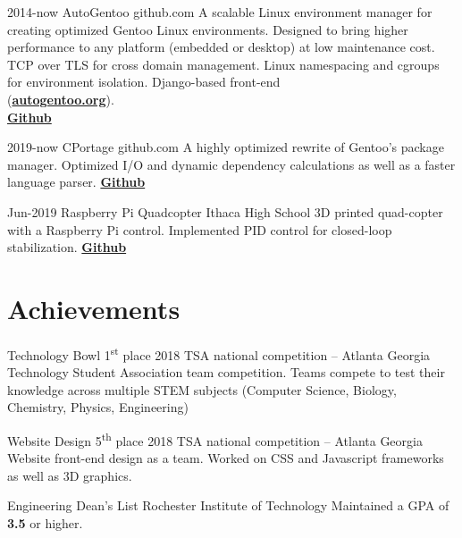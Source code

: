 \documentclass[]{alternate}
\begin{document}
\begin{entrylist}
\entry
{2014-now}
{AutoGentoo }
{github.com}
{A scalable Linux environment manager for creating optimized Gentoo Linux environments. Designed to bring higher performance to any platform (embedded or desktop) at low maintenance cost. TCP over TLS for cross domain management. Linux namespacing and cgroups for environment isolation. Django-based front-end \\ (\textbf{\href{https://autogentoo.org}{autogentoo.org}}).\\
\textbf{\href{https://github.com/AutoGentoo/AutoGentoo}{Github}}
}

\entry
{2019-now}
{CPortage}
{github.com}
{A highly optimized rewrite of Gentoo's package manager. Optimized I/O and dynamic dependency calculations as well as a faster language parser. \textbf{\href{https://github.com/AutoGentoo/AutoGentoo/tree/develop/cportage}{Github}}
}

\entry
{Jun-2019}
{Raspberry Pi Quadcopter }
{Ithaca High School}
{3D printed quad-copter with a Raspberry Pi control. Implemented PID control for closed-loop stabilization. \textbf{\href{https://github.com/Kronos3/Quadcopter}{Github}} }
{\vspace{-0.3cm}}
\end{entrylist}

\pagebreak
\section{Achievements}

\begin{entrylist}
\entry
{}
{Technology Bowl 1\textsuperscript{st} place}
{2018 TSA national competition -- Atlanta Georgia}
{Technology Student Association team competition. Teams compete to test their knowledge across multiple STEM subjects (Computer Science, Biology, Chemistry, Physics, Engineering)}

\end{entrylist}
\begin{entrylist}

\entry
{}
{Website Design 5\textsuperscript{th} place}
{2018 TSA national competition -- Atlanta Georgia}
{Website front-end design as a team. Worked on CSS and Javascript frameworks as well as 3D graphics.}


\end{entrylist}
\begin{entrylist}

\entry
{}
{Engineering Dean's List}
{Rochester Institute of Technology}
{Maintained a GPA of \textbf{3.5} or higher.}

\end{entrylist}
\end{document}
